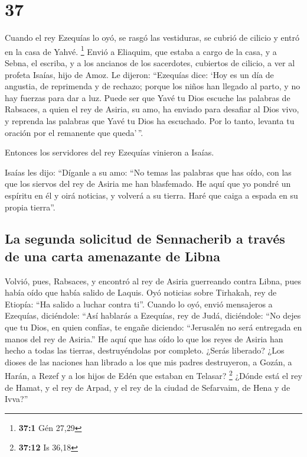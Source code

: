 \hypertarget{section-36}{%
\section{37}\label{section-36}}

 Cuando el rey Ezequías lo oyó, se rasgó las vestiduras,
se cubrió de cilicio y entró en la casa de Yahvé. \footnote{\textbf{37:1}
  Gén 27,29}  Envió a Eliaquim, que estaba a cargo de la
casa, y a Sebna, el escriba, y a los ancianos de los sacerdotes,
cubiertos de cilicio, a ver al profeta Isaías, hijo de Amoz.
 Le dijeron: ``Ezequías dice: `Hoy es un día de angustia,
de reprimenda y de rechazo; porque los niños han llegado al parto, y no
hay fuerzas para dar a luz.  Puede ser que Yavé tu Dios
escuche las palabras de Rabsaces, a quien el rey de Asiria, su amo, ha
enviado para desafiar al Dios vivo, y reprenda las palabras que Yavé tu
Dios ha escuchado. Por lo tanto, levanta tu oración por el remanente que
queda'\,''.

 Entonces los servidores del rey Ezequías vinieron a
Isaías.

 Isaías les dijo: ``Díganle a su amo: ``No temas las
palabras que has oído, con las que los siervos del rey de Asiria me han
blasfemado.  He aquí que yo pondré un espíritu en él y
oirá noticias, y volverá a su tierra. Haré que caiga a espada en su
propia tierra''.

\hypertarget{la-segunda-solicitud-de-sennacherib-a-travuxe9s-de-una-carta-amenazante-de-libna}{%
\subsection{La segunda solicitud de Sennacherib a través de una carta
amenazante de
Libna}\label{la-segunda-solicitud-de-sennacherib-a-travuxe9s-de-una-carta-amenazante-de-libna}}

 Volvió, pues, Rabsaces, y encontró al rey de Asiria
guerreando contra Libna, pues había oído que había salido de Laquis.
 Oyó noticias sobre Tirhakah, rey de Etiopía: ``Ha salido
a luchar contra ti''. Cuando lo oyó, envió mensajeros a Ezequías,
diciéndole:  ``Así hablarás a Ezequías, rey de Judá,
diciéndole: ``No dejes que tu Dios, en quien confías, te engañe
diciendo: ``Jerusalén no será entregada en manos del rey de Asiria.''
 He aquí que has oído lo que los reyes de Asiria han
hecho a todas las tierras, destruyéndolas por completo. ¿Serás liberado?
 ¿Los dioses de las naciones han librado a los que mis
padres destruyeron, a Gozán, a Harán, a Rezef y a los hijos de Edén que
estaban en Telasar? \footnote{\textbf{37:12} Is 36,18} 
¿Dónde está el rey de Hamat, y el rey de Arpad, y el rey de la ciudad de
Sefarvaim, de Hena y de Ivva?''

